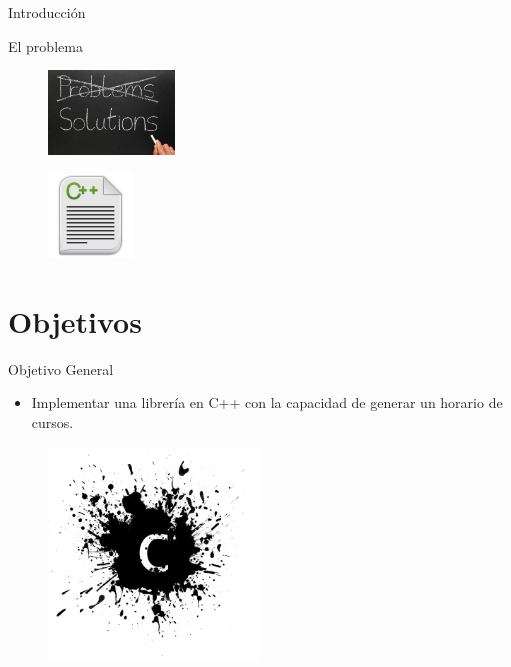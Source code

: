 \documentclass[10pt]{beamer}
\begin{document}
\begin{frame}{Introducción}{}
\begin{block}{}
	 El problema
\begin{figure}[!h]
 \begin{flushleft}
\includegraphics[width=0.3\textwidth]{./AAUgraphics/problem2.jpg}
\end{flushleft}
\end{figure}

\begin{figure}[!h]
 \begin{flushright}
 \includegraphics[width=0.2\textwidth]{./AAUgraphics/cfile.jpg}
 \end{flushright}
\end{figure}

\end{block}
\end{frame}

\section{Objetivos}
\begin{frame}{Objetivo General}
\begin{block}{}
  \begin{itemize}
  \item Implementar una librería en C++ con la capacidad de generar un horario de cursos.
  \end{itemize} 
  
\begin{figure}[!h]
\centering
\includegraphics[width=0.50\textwidth]{./AAUgraphics/cpintura.png}
\end{figure}
  
  
\end{block}
\end{frame}
\end{document}
